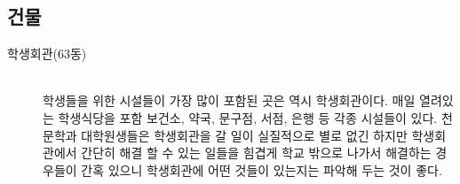 \subsection{건물}
\begin{description}
\item[\textsf{학생회관(63동)}] \hfill \\
  학생들을 위한 시설들이 가장 많이 포함된 곳은 역시 학생회관이다. 매일 열려있는
  학생식당을 포함 보건소, 약국, 문구점, 서점, 은행 등 각종 시설들이
  있다. 천문학과 대학원생들은 학생회관을 갈 일이 실질적으로 별로 없긴 하지만
  학생회관에서 간단히 해결 할 수 있는 일들을 힘겹게 학교 밖으로 나가서 해결하는
  경우들이 간혹 있으니 학생회관에 어떤 것들이 있는지는 파악해 두는 것이 좋다.


\end{description}
